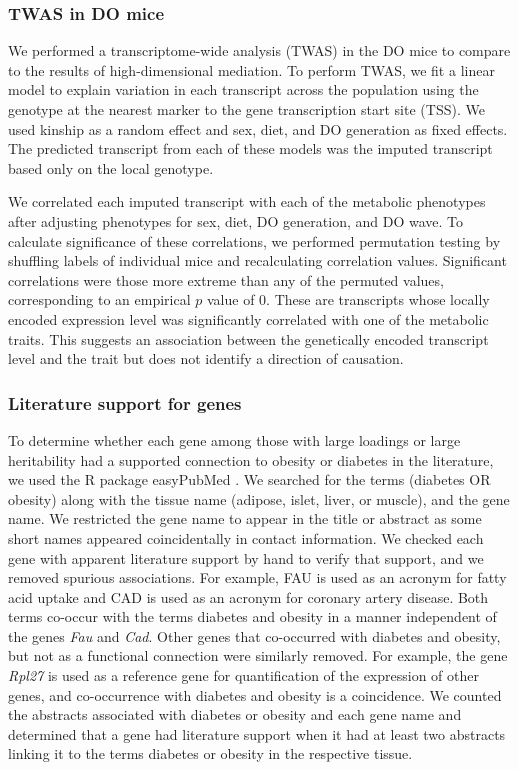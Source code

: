 \documentclass[
]{article}
\begin{document}
\subsubsection{TWAS in DO mice}\label{twas-in-do-mice}

We performed a transcriptome-wide analysis (TWAS) \cite{pmid26258848, 
pmid26854917} in the DO mice to compare to the results of
high-dimensional mediation. To perform TWAS, we fit a linear model to
explain variation in each transcript across the population using the
genotype at the nearest marker to the gene transcription start site
(TSS). We used kinship as a random effect and sex, diet, and DO
generation as fixed effects. The predicted transcript from each of these
models was the imputed transcript based only on the local genotype.

We correlated each imputed transcript with each of the metabolic
phenotypes after adjusting phenotypes for sex, diet, DO generation, and
DO wave. To calculate significance of these correlations, we performed
permutation testing by shuffling labels of individual mice and
recalculating correlation values. Significant correlations were those
more extreme than any of the permuted values, corresponding to an
empirical \(p\) value of 0. These are transcripts whose locally encoded
expression level was significantly correlated with one of the metabolic
traits. This suggests an association between the genetically encoded
transcript level and the trait but does not identify a direction of
causation.

\subsubsection{Literature support for
genes}\label{literature-support-for-genes}

To determine whether each gene among those with large loadings or large
heritability had a supported connection to obesity or diabetes in the
literature, we used the R package easyPubMed \cite{easyPubMed}. We
searched for the terms (diabetes OR obesity) along with the tissue name
(adipose, islet, liver, or muscle), and the gene name. We restricted the
gene name to appear in the title or abstract as some short names
appeared coincidentally in contact information. We checked each gene
with apparent literature support by hand to verify that support, and we
removed spurious associations. For example, FAU is used as an acronym
for fatty acid uptake and CAD is used as an acronym for coronary artery
disease. Both terms co-occur with the terms diabetes and obesity in a
manner independent of the genes \textit{Fau} and \textit{Cad}. Other
genes that co-occurred with diabetes and obesity, but not as a
functional connection were similarly removed. For example, the gene
\textit{Rpl27} is used as a reference gene for quantification of the
expression of other genes, and co-occurrence with diabetes and obesity
is a coincidence. We counted the abstracts associated with diabetes or
obesity and each gene name and determined that a gene had literature
support when it had at least two abstracts linking it to the terms
diabetes or obesity in the respective tissue.
\end{document}
